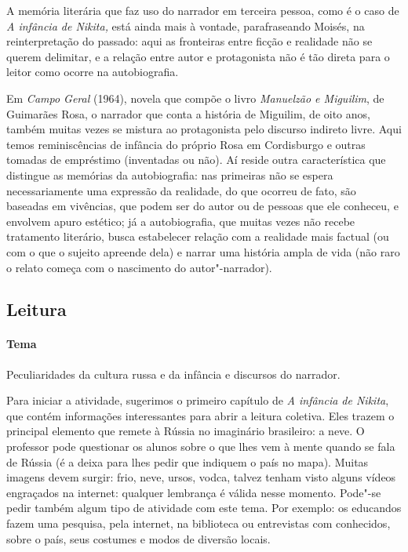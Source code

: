 \documentclass[11pt]{extarticle}
\begin{document}
A memória literária que faz uso do narrador em terceira pessoa, como é o
caso de \emph{A infância de Nikita,} está ainda mais à vontade,
parafraseando Moisés, na reinterpretação do passado: aqui as fronteiras
entre ficção e realidade não se querem delimitar, e a relação entre
autor e protagonista não é tão direta para o leitor como ocorre na
autobiografia.

Em \emph{Campo Geral} (1964), novela que compõe o livro \emph{Manuelzão
e Miguilim}, de Guimarães Rosa, o narrador que conta a história de
Miguilim, de oito anos, também muitas vezes se mistura ao protagonista
pelo discurso indireto livre. Aqui temos reminiscências de infância do
próprio Rosa em Cordisburgo e outras tomadas de empréstimo (inventadas
ou não). Aí reside outra característica que distingue as memórias da
autobiografia: nas primeiras não se espera necessariamente uma expressão
da realidade, do que ocorreu de fato, são baseadas em vivências, que
podem ser do autor ou de pessoas que ele conheceu, e envolvem apuro
estético; já a autobiografia, que muitas vezes não recebe tratamento
literário, busca estabelecer relação com a realidade mais factual (ou
com o que o sujeito apreende dela) e narrar uma história ampla de vida
(não raro o relato começa com o nascimento do autor"-narrador).


\subsection{Leitura}

\paragraph{Tema} Peculiaridades da cultura russa e da infância e
discursos do narrador.

Para iniciar a atividade, sugerimos o primeiro capítulo de \emph{A
infância de Nikita}, que contém informações interessantes para abrir a
leitura coletiva. Eles trazem o principal elemento que remete à Rússia
no imaginário brasileiro: a neve. O professor pode questionar os alunos
sobre o que lhes vem à mente quando se fala de Rússia (é a deixa para
lhes pedir que indiquem o país no mapa). Muitas imagens devem surgir:
frio, neve, ursos, vodca, talvez tenham visto alguns vídeos engraçados
na internet: qualquer lembrança é válida nesse momento. Pode"-se pedir
também algum tipo de atividade com este tema. Por exemplo: os educandos
fazem uma pesquisa, pela internet, na biblioteca ou entrevistas com
conhecidos, sobre o país, seus costumes e modos de diversão locais.
\end{document}

